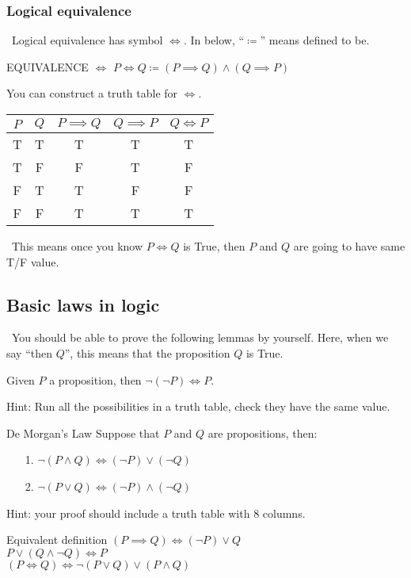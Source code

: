 \documentclass{article}
\begin{document}
\subsubsection{Logical equivalence}
\quad\ Logical equivalence has symbol $\iff$. In below, ``$\coloneqq$'' means defined to be.
\begin{defin}{EQUIVALENCE $\iff$}
    $P \iff Q \coloneqq (P \implies Q)\land (Q \implies P)$

\end{defin}
You can construct a truth table for $\iff$.
\begin{center}
    \begin{tabular}{|c|c|c|c|c|}
        \hline
        $P$ & $Q$ & $P \implies Q$ & $Q \implies P$ & $Q \iff P$\\ \hline
        T   & T   & T & T  & T\\ \hline
        T   & F   & F & T  & F\\ \hline
        F   & T   & T & F  & F\\ \hline
        F   & F   & T & T  & T \\ \hline
    \end{tabular}
\end{center}
\quad\ This means once you know $P \iff Q$ is True, then $P$ and $Q$ are going to have same T/F value.
\subsection{Basic laws in logic}
\quad\ You should be able to prove the following lemmas by yourself. Here, when we say ``then $Q$'', this means that
the proposition $Q$ is True.
\begin{lemma}

    Given $P$ a proposition, then $\neg (\neg P) \iff P$.

\end{lemma}
Hint: Run all the possibilities in a truth table, check they have the same value.
\begin{thm}{De Morgan's Law}
    Suppose that $P$ and $Q$ are propositions, then:
\begin{itemize}
    \item[1.] $\neg (P \land Q) \iff (\neg P) \lor (\neg Q)$
    \item[2.] $\neg (P \lor Q) \iff (\neg P) \land (\neg Q)$
\end{itemize}
\end{thm}
Hint: your proof should include a truth table with $8$ columns.
\begin{lemma}{Equivalent definition}
    $(P \implies Q) \iff (\neg P) \lor Q$\\
    $P \lor (Q \land \neg Q) \iff P$\\
    $(P \iff Q) \iff \neg (P \lor Q) \lor (P \land Q)$

\end{lemma}
\end{document}
